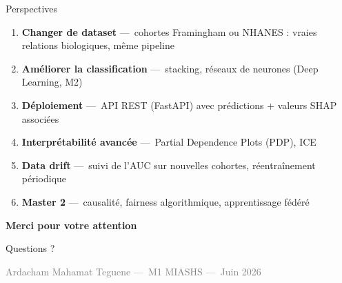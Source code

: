 \documentclass[12pt]{beamer}
\begin{document}
\begin{frame}{Perspectives}

\begin{enumerate}
  \item \textbf{Changer de dataset} ---~cohortes Framingham ou NHANES : vraies relations biologiques, même pipeline
  \item \textbf{Améliorer la classification} ---~stacking, réseaux de neurones (Deep Learning, M2)
  \item \textbf{Déploiement} ---~API REST (FastAPI) avec prédictions + valeurs SHAP associées
  \item \textbf{Interprétabilité avancée} ---~Partial Dependence Plots (PDP), ICE
  \item \textbf{Data drift} ---~suivi de l'AUC sur nouvelles cohortes, réentraînement périodique
  \item \textbf{Master 2} ---~causalité, fairness algorithmique, apprentissage fédéré
\end{enumerate}

\end{frame}

\begin{frame}

\vspace{2cm}
\begin{center}
{\Large\textcolor{bleutitre}{\textbf{Merci pour votre attention}}}

\bigskip\bigskip

{\large Questions ?}

\bigskip\bigskip\bigskip

\textcolor{gray}{\small Ardacham Mahamat Teguene ---~M1 MIASHS ---~Juin 2026}
\end{center}

\end{frame}
\end{document}
